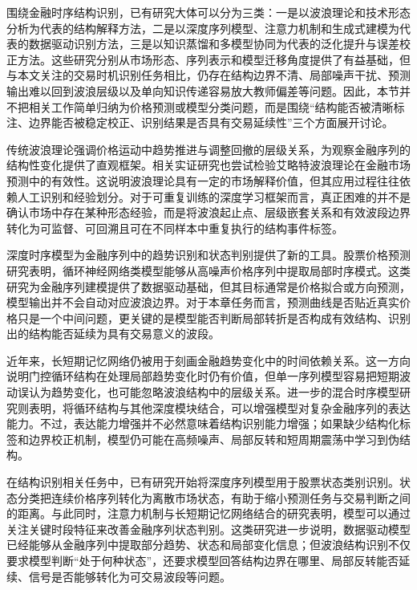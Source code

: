 围绕金融时序结构识别，已有研究大体可以分为三类：一是以波浪理论和技术形态分析为代表的结构解释方法，二是以深度序列模型、注意力机制和生成式建模为代表的数据驱动识别方法，三是以知识蒸馏和多模型协同为代表的泛化提升与误差校正方法。这些研究分别从市场形态、序列表示和模型迁移角度提供了有益基础，但与本文关注的交易时机识别任务相比，仍存在结构边界不清、局部噪声干扰、预测输出难以回到波浪层级以及单向知识传递容易放大教师偏差等问题。因此，本节并不把相关工作简单归纳为价格预测或模型分类问题，而是围绕“结构能否被清晰标注、边界能否被稳定校正、识别结果是否具有交易延续性”三个方面展开讨论。

传统波浪理论强调价格运动中趋势推进与调整回撤的层级关系，为观察金融序列的结构性变化提供了直观框架。相关实证研究也尝试检验艾略特波浪理论在金融市场预测中的有效性\cite{dangelo2017effectiveness}。这说明波浪理论具有一定的市场解释价值，但其应用过程往往依赖人工识别和经验划分。对于可重复训练的深度学习框架而言，真正困难的并不是确认市场中存在某种形态经验，而是将波浪起止点、层级嵌套关系和有效波段边界转化为可监督、可回溯且可在不同样本中重复执行的结构事件标签。

深度时序模型为金融序列中的趋势识别和状态判别提供了新的工具。股票价格预测研究表明，循环神经网络类模型能够从高噪声价格序列中提取局部时序模式\cite{nelson2017stock}。这类研究为金融序列建模提供了数据驱动基础，但其目标通常是价格拟合或方向预测，模型输出并不会自动对应波浪边界。对于本章任务而言，预测曲线是否贴近真实价格只是一个中间问题，更关键的是模型能否判断局部转折是否构成有效结构、识别出的结构能否延续为具有交易意义的波段。

近年来，长短期记忆网络仍被用于刻画金融趋势变化中的时间依赖关系\cite{xie2025lstm_trend}。这一方向说明门控循环结构在处理局部趋势变化时仍有价值，但单一序列模型容易把短期波动误认为趋势变化，也可能忽略波浪结构中的层级关系。进一步的混合时序模型研究则表明，将循环结构与其他深度模块结合，可以增强模型对复杂金融序列的表达能力\cite{ma2025transformer_lstm}。不过，表达能力增强并不必然意味着结构识别能力增强；如果缺少结构化标签和边界校正机制，模型仍可能在高频噪声、局部反转和短周期震荡中学习到伪结构。

在结构识别相关任务中，已有研究开始将深度序列模型用于股票状态类别识别\cite{wang2025lstm_classification}。状态分类把连续价格序列转化为离散市场状态，有助于缩小预测任务与交易判断之间的距离。与此同时，注意力机制与长短期记忆网络结合的研究表明，模型可以通过关注关键时段特征来改善金融序列状态判别\cite{li2024attention_lstm}。这类研究进一步说明，数据驱动模型已经能够从金融序列中提取部分趋势、状态和局部变化信息；但波浪结构识别不仅要求模型判断“处于何种状态”，还要求模型回答结构边界在哪里、局部反转能否延续、信号是否能够转化为可交易波段等问题。

